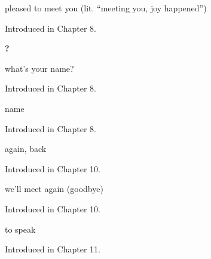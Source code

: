 \noindent\begin{minipage}[t]{\linewidth}
\raggedright
\textbf{   }\par
\small pleased to meet you (lit. \textquotedblleft{}meeting you, joy happened\textquotedblright{})\par
\footnotesize Introduced in Chapter 8.
\end{minipage}\par\medskip

\noindent\begin{minipage}[t]{\linewidth}
\raggedright
\textbf{   ?}\par
\small what's your name?\par
\footnotesize Introduced in Chapter 8.
\end{minipage}\par\medskip

\noindent\begin{minipage}[t]{\linewidth}
\raggedright
\textbf{}\par
\small name\par
\footnotesize Introduced in Chapter 8.
\end{minipage}\par\medskip

\noindent\begin{minipage}[t]{\linewidth}
\raggedright
\textbf{}\par
\small again, back\par
\footnotesize Introduced in Chapter 10.
\end{minipage}\par\medskip

\noindent\begin{minipage}[t]{\linewidth}
\raggedright
\textbf{ }\par
\small we'll meet again (goodbye)\par
\footnotesize Introduced in Chapter 10.
\end{minipage}\par\medskip

\noindent\begin{minipage}[t]{\linewidth}
\raggedright
\textbf{}\par
\small to speak\par
\footnotesize Introduced in Chapter 11.
\end{minipage}\par\medskip

